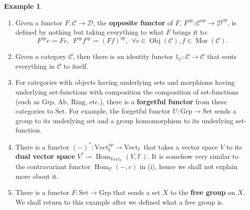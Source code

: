 \documentclass{article}
\theoremstyle{definition}
\theoremstyle{definition}
\newtheorem{example}{Example}[section]
\theoremstyle{remark}
\DeclareMathOperator{\Obj}{Obj}
\DeclareMathOperator{\Mor}{Mor}
\DeclareMathOperator{\Hom}{Hom}
\begin{document}
\begin{example}
\begin{enumerate}[label=(\roman*)]
	\item Given a functor $F:\mathcal{C}\to \mathcal{D}$, the \textbf{opposite functor} of $F$, $F^{op}:\mathcal{C}^{op}\to \mathcal{D}^{op}$, is defined by nothing but taking everything to what $F$ brings it to:
	\[F^{op}c\coloneqq Fc,\ \ F^{op}f^{op}\coloneqq (Ff)^{op},\ \ \forall c\in\Obj(\mathcal{C}), f\in\Mor(\mathcal{C}).\]
	\item Given a category $\mathcal{C}$, then there is an identity functor $1_\mathcal{C}:\mathcal{C}\to\mathcal{C}$ that sents everything in $\mathcal{C}$ to itself.
	\item For categories with objects having underlying sets and morphisms having underlying set-functions with composition the composition of set-functions (such as $\mathrm{Grp}$, $\mathrm{Ab}$, $\mathrm{Ring}$, etc.), there is a \textbf{forgetful functor} from these categories to $\mathrm{Set}$. For example, the forgetful functor $U:\mathrm{Grp}\to \mathrm{Set}$ sends a group to its underlying set and a group homomorphism to its underlying set-function.
	\item There is a functor $(-)^*:\mathrm{Vect}_\mathbb{F}^{op}\to \mathrm{Vect}_\mathbb{F}$ that takes a vector space $V$ to its \textbf{dual vector space} $V^*\coloneqq\Hom_{\mathrm{Vect}_\mathbb{F}}(V,\mathbb{F})$. It is somehow very similar to the contravariant functor $\Hom_\mathcal{C}(-,c)$ in (i), hence we shall not explain more about it.
	\item There is a functor $F:\mathrm{Set}\to \mathrm{Grp}$ that sends a set $X$ to the \textbf{free group} on $X$. We shall return to this example after we defined what a free group is.
	\end{enumerate}
	\end{example}
\end{document}
